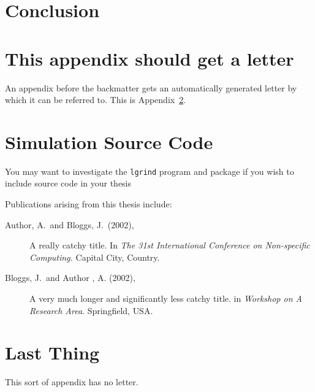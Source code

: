 \documentclass[a4paper,11pt,bcshonoursthesis,singlespace,twoside]{cssethesis}
\begin{document}
\chapter{Conclusion}

\appendix %


\chapter{This appendix should get a letter}
\label{app:example}
An appendix before the backmatter gets an automatically generated letter by
which it can be referred to. This is Appendix~\ref{app:example}.

\chapter{Simulation Source Code}
You may want to investigate the \texttt{lgrind} program and package if you
wish to include source code in your thesis


\backmatter						%
\begin{thesisauthorvita}
\begin{spacing}{1}
Publications arising from this thesis include:
\begin{description}
\item[Author, A.\ and Bloggs, J.\ (2002),]
A really catchy title. In \emph{The 31st International Conference
on Non-specific Computing.} Capital City, Country.
\item[Bloggs, J.\ and Author , A. (2002),]
A very much longer and significantly less catchy title. in \emph {Workshop on
A Research Area}. Springfield, USA.
\end{description}
\end{spacing}
\end{thesisauthorvita}


\chapter{Last Thing} %
This sort of appendix has no letter. 
\end{document}
